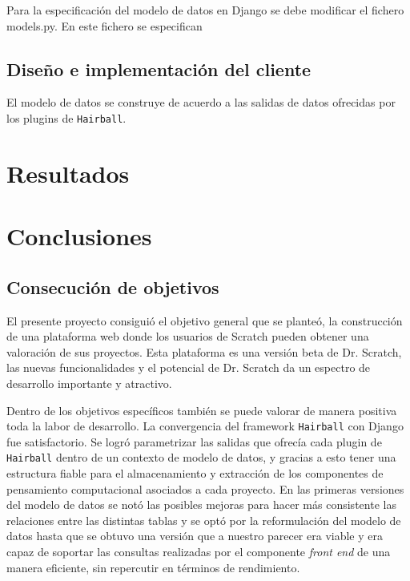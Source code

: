 \documentclass[a4paper, 12pt]{book}
\begin{document}
Para la especificación del modelo de datos en Django se debe modificar el fichero models.py. En este fichero
se especifican 

\section{Diseño e implementación del cliente}
\label{sec:cliente}

El modelo de datos se construye de acuerdo a las salidas de datos ofrecidas por los plugins de
\texttt{Hairball}.





\cleardoublepage
\chapter{Resultados}



\cleardoublepage
\chapter{Conclusiones}
\label{chap:conclusiones}


\section{Consecución de objetivos}
\label{sec:consecucion-objetivos}

El presente proyecto consiguió el objetivo general que se planteó, la 
construcción de una plataforma web donde los usuarios de Scratch pueden 
obtener una valoración de sus proyectos. Esta plataforma es una versión
beta de Dr. Scratch, las nuevas funcionalidades y el potencial de Dr. 
Scratch da un espectro de desarrollo importante y atractivo.

Dentro de los objetivos específicos también se puede valorar de manera
positiva toda la labor de desarrollo. La convergencia del framework
\texttt{Hairball} con Django fue satisfactorio. Se logró parametrizar las salidas
que ofrecía cada plugin de \texttt{Hairball} dentro de un contexto de modelo de
datos, y gracias a esto tener una estructura fiable para el almacenamiento
y extracción de los componentes de pensamiento computacional asociados
a cada proyecto. En las primeras versiones del modelo de datos se notó
las posibles mejoras para hacer más consistente las relaciones entre las
distintas tablas y se optó por la reformulación del modelo de datos hasta
que se obtuvo una versión que a nuestro parecer era viable y era capaz
de soportar las consultas realizadas por el componente \emph{front end} de una
manera eficiente, sin repercutir en términos de rendimiento.
\end{document}
